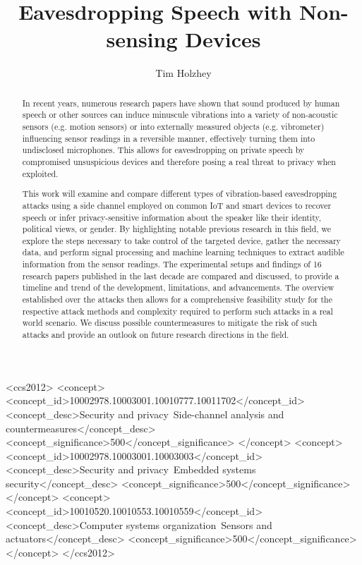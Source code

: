 \documentclass[sigconf, nonacm]{acmart}
\begin{document}
\title{Eavesdropping Speech with Non-sensing Devices}

\author{Tim Holzhey}

\begin{abstract}
  In recent years, numerous research papers have shown that sound produced by human speech or other sources can induce minuscule vibrations into a variety of non-acoustic sensors (e.g. motion sensors) or into externally measured objects (e.g. vibrometer) influencing sensor readings in a reversible manner, effectively turning them into undisclosed microphones.
  This allows for eavesdropping on private speech by compromised unsuspicious devices and therefore posing a real threat to privacy when exploited.
  
  This work will examine and compare different types of vibration-based eavesdropping attacks using a side channel employed on common IoT and smart devices to recover speech or infer privacy-sensitive information about the speaker like their identity, political views, or gender.
  By highlighting notable previous research in this field, we explore the steps necessary to take control of the targeted device, gather the necessary data, and perform signal processing and machine learning techniques to extract audible information from the sensor readings.
  The experimental setups and findings of 16 research papers published in the last decade are compared and discussed, to provide a timeline and trend of the development, limitations, and advancements.
  The overview established over the attacks then allows for a comprehensive feasibility study for the respective attack methods and complexity required to perform such attacks in a real world scenario.
  We discuss possible countermeasures to mitigate the risk of such attacks and provide an outlook on future research directions in the field.
\end{abstract}

\begin{CCSXML}
  <ccs2012>
  <concept>
  <concept_id>10002978.10003001.10010777.10011702</concept_id>
  <concept_desc>Security and privacy~Side-channel analysis and countermeasures</concept_desc>
  <concept_significance>500</concept_significance>
  </concept>
  <concept>
  <concept_id>10002978.10003001.10003003</concept_id>
  <concept_desc>Security and privacy~Embedded systems security</concept_desc>
  <concept_significance>500</concept_significance>
  </concept>
  <concept>
  <concept_id>10010520.10010553.10010559</concept_id>
  <concept_desc>Computer systems organization~Sensors and actuators</concept_desc>
  <concept_significance>500</concept_significance>
  </concept>
  </ccs2012>
\end{CCSXML}
\end{document}
